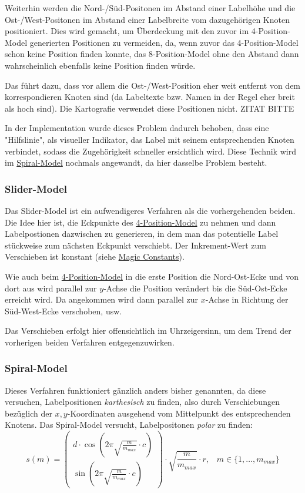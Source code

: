 Weiterhin werden die Nord-/Süd-Positonen im Abstand einer Labelhöhe und die Ost-/West-Positonen im Abstand einer Labelbreite vom dazugehörigen Knoten positioniert.
Dies wird gemacht, um Überdeckung mit den zuvor im 4-Position-Model generierten Positionen zu vermeiden, da, wenn zuvor das 4-Position-Model schon keine Position finden konnte,
das 8-Position-Model ohne den Abstand dann wahrscheinlich ebenfalls keine Position finden würde.

Das führt dazu, dass vor allem die Ost-/West-Position eher weit entfernt von dem korrespondieren Knoten sind (da Labeltexte bzw. Namen in der Regel eher breit als hoch sind).
Die Kartografie verwendet diese Positionen nicht. ZITAT BITTE

In der Implementation wurde dieses Problem dadurch behoben, dass eine "Hilfslinie", als visueller Indikator, das Label mit seinem entsprechenden Knoten verbindet,
sodass die Zugehörigkeit schneller ersichtlich wird.
Diese Technik wird im \hyperref[subsubsec:spiral]{Spiral-Model} nochmals angewandt, da hier dasselbe Problem besteht.

\subsubsection{Slider-Model}
Das Slider-Model ist ein aufwendigeres Verfahren als die vorhergehenden beiden. Die Idee hier ist, die Eckpunkte des \hyperref[subsubsec:4pos]{4-Position-Model} zu nehmen
und dann Labelpostionen dazwischen zu generieren, in dem man das potentielle Label stückweise zum nächsten Eckpunkt verschiebt. Der Inkrement-Wert zum Verschieben ist konstant (siehe \hyperref[subsec:consts]{Magic Constants}).

Wie auch beim \hyperref[subsubsec:4pos]{4-Position-Model} in die erste Position die Nord-Ost-Ecke und von dort aus wird parallel zur $y$-Achse die Position verändert bis die Süd-Ost-Ecke erreicht wird.
Da angekommen wird dann parallel zur $x$-Achse in Richtung der Süd-West-Ecke verschoben, usw.

Das Verschieben erfolgt hier offensichtlich im Uhrzeigersinn, um dem Trend der vorherigen beiden Verfahren entgegenzuwirken.


\subsubsection{Spiral-Model}
\label{subsubsec:spiral}

Dieses Verfahren funktioniert gänzlich anders bisher genannten, da diese versuchen, Labelpositionen \textit{karthesisch} zu finden, also durch Verschiebungen
bezüglich der $x,y$-Koordinaten ausgehend vom Mittelpunkt des entsprechenden Knotens. Das Spiral-Model versucht, Labelpositonen \textit{polar} zu finden:
$$ s(m) =
    \left(\begin{array}{c}
              d \cdot \cos (2 \pi \sqrt{\frac{m}{m_{max}}} \cdot c) \\
    \sin (2 \pi \sqrt{\frac{m}{m_{max}}} \cdot c)\end{array}\right) \cdot \sqrt{\frac{m}{m_{max}}} \cdot r,\; \; \; m \in \{1, \dots, m_{max} \}
$$

